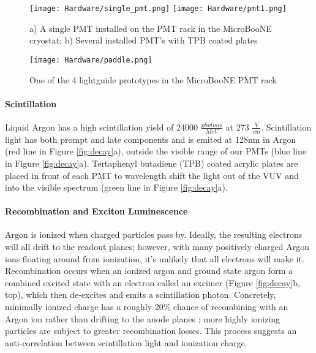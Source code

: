 \begin{figure}[h!]
\centering
\texttt{[image: Hardware/single\_pmt.png]}
\hspace{3 mm}
\texttt{[image: Hardware/pmt1.png]}
\caption{ a) A single PMT installed on the PMT rack in the MicroBooNE cryostat; b) Several installed PMT's with TPB coated plates  } 
\label{fig:pmt}
\end{figure}

\begin{wrapfigure}{r}{0.4\textwidth}
\centering
\texttt{[image: Hardware/paddle.png]}
\caption{One of the 4 lightguide prototypes in the MicroBooNE PMT rack}
\label{fig:paddle}
\end{wrapfigure}

\paragraph{Scintillation}
\par Liquid Argon has a high scintillation yield of 24000 $\frac{photons}{MeV}$ at 273 $\frac{V}{cm}$.  Scintillation light has both prompt and late components and is emited at 128nm in Argon (red line in Figure \ref{fig:decay}a), outside the visible range of our PMTs (blue line in Figure \ref{fig:decay}a). Tertaphenyl butadiene (TPB) coated acrylic plates are placed in front of each PMT to wavelength shift the light out of the VUV and into the visible spectrum (green line in Figure \ref{fig:decay}a). 

\paragraph{Recombination and Exciton Luminescence}

\par Argon is ionized when charged particles pass by. Ideally, the resulting electrons will all drift to the readout planes; however, with many positively charged Argon ions floating around from ionization, it's unlikely that all electrons will make it. Recombination occurs when an ionized argon and ground state argon form a combined excited state with an electron called an excimer (Figure \ref{fig:decay}b, top), which then de-excites and emits a scintillation photon. Concretely, minimally ionized charge has a roughly 20\% chance of recombining with an Argon ion rather than drifting to the anode planes \cite{bib:sorel}; more highly ionizing particles are subject to greater recombination losses. This process suggests an anti-correlation between scintillation light and ionization charge.

